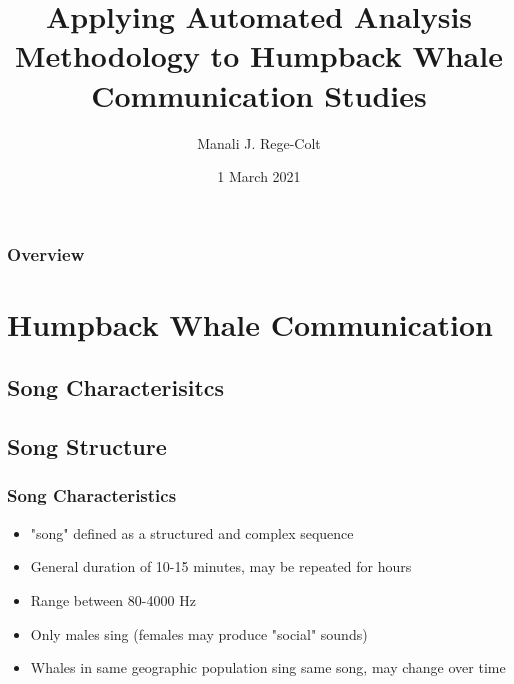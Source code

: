 \documentclass[12pt]{beamer}\usepackage[]{graphicx}\usepackage[]{color}
\title[SPCC & Humpback Whales]{Applying Automated Analysis Methodology to Humpback Whale Communication Studies} %
\author{Manali J. Rege-Colt} %
\institute[UVM] %
{
University of Vermont \\ %
Department of Biology \\
Burlington, VT 05401 USA \\ 
\medskip
\textit{mregeco@uvm.edu} %
}
\date{1 March 2021} %
\begin{document}
\begin{frame}
\titlepage %
\end{frame}


\begin{frame}
\frametitle{Overview} %
\tableofcontents %
\end{frame}

\section{Humpback Whale Communication} %

\subsection{Song Characterisitcs } %

\subsection{Song Structure}

\begin{frame}
\frametitle{Song Characteristics}
\begin{itemize}
\item "song" defined as a structured and complex sequence 
\item  General duration of 10-15 minutes, may be repeated for hours
\item Range between 80-4000 Hz
\item Only males sing (females may produce "social" sounds)
\item Whales in same geographic population sing same song, may change over time
\end{itemize}
\end{frame}
\end{document}
